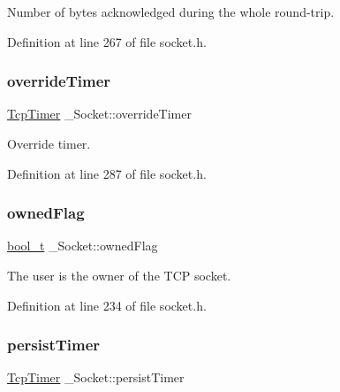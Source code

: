Number of bytes acknowledged during the whole round-\/trip. 



Definition at line 267 of file socket.\+h.

\mbox{\label{struct__Socket_ade20a8ca035328791d5370d8ade55832}} 
\subsubsection{\texorpdfstring{override\+Timer}{overrideTimer}}
{\footnotesize\ttfamily \hyperlink{structTcpTimer}{Tcp\+Timer} \+\_\+\+Socket\+::override\+Timer}



Override timer. 



Definition at line 287 of file socket.\+h.

\mbox{\label{struct__Socket_a71faf3a071a85744df37461200a1de95}} 
\subsubsection{\texorpdfstring{owned\+Flag}{ownedFlag}}
{\footnotesize\ttfamily \hyperlink{compiler__port_8h_a812d16e5494522586b3784e55d479912}{bool\+\_\+t} \+\_\+\+Socket\+::owned\+Flag}



The user is the owner of the T\+CP socket. 



Definition at line 234 of file socket.\+h.

\mbox{\label{struct__Socket_a621c94b77ad3f7718bec14fde138ffab}} 
\subsubsection{\texorpdfstring{persist\+Timer}{persistTimer}}
{\footnotesize\ttfamily \hyperlink{structTcpTimer}{Tcp\+Timer} \+\_\+\+Socket\+::persist\+Timer}




